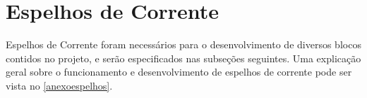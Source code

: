 \section{Espelhos de Corrente}

Espelhos de Corrente foram necess\'arios para o desenvolvimento de diversos blocos contidos no projeto, e serão especificados nas subseções seguintes. Uma explicação geral sobre o funcionamento e desenvolvimento de espelhos de corrente pode ser vista no \autoref{anexoespelhos}.



